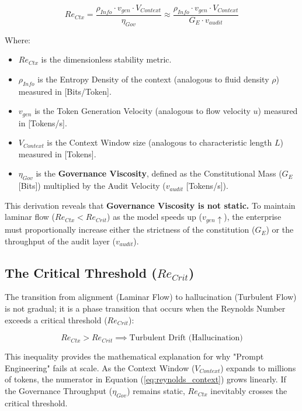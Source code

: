 \documentclass[11pt, a4paper]{article}
\newcommand{\Ge}{G_E}
\newcommand{\Vctx}{V_{Context}}
\newcommand{\ReCtx}{Re_{Ctx}}
\begin{document}
\begin{equation}
    \label{eq:reynolds_context}
    \ReCtx = \frac{\rho_{Info} \cdot v_{gen} \cdot \Vctx}{\eta_{Gov}} \approx \frac{\rho_{Info} \cdot v_{gen} \cdot \Vctx}{\Ge \cdot v_{audit}}
\end{equation}

\noindent
Where:
\begin{itemize}
    \item \textbf{$\ReCtx$} is the dimensionless stability metric.
    \item \textbf{$\rho_{Info}$} is the Entropy Density of the context (analogous to fluid density $\rho$) measured in [Bits/Token].
    \item \textbf{$v_{gen}$} is the Token Generation Velocity (analogous to flow velocity $u$) measured in [Tokens/s].
    \item \textbf{$\Vctx$} is the Context Window size (analogous to characteristic length $L$) measured in [Tokens].
    \item \textbf{$\eta_{Gov}$} is the \textbf{Governance Viscosity}, defined as the Constitutional Mass ($\Ge$ [Bits]) multiplied by the Audit Velocity ($v_{audit}$ [Tokens/s]).
\end{itemize}

This derivation reveals that \textbf{Governance Viscosity is not static.} To maintain laminar flow ($\ReCtx < Re_{Crit}$) as the model speeds up ($v_{gen} \uparrow$), the enterprise must proportionally increase either the strictness of the constitution ($\Ge$) or the throughput of the audit layer ($v_{audit}$).

\subsection{The Critical Threshold ($Re_{Crit}$)}

The transition from alignment (Laminar Flow) to hallucination (Turbulent Flow) is not gradual; it is a phase transition that occurs when the Reynolds Number exceeds a critical threshold ($Re_{Crit}$):

\begin{equation}
    \label{eq:turbulence_condition}
    \ReCtx > Re_{Crit} \implies \text{Turbulent Drift (Hallucination)}
\end{equation}

This inequality provides the mathematical explanation for why "Prompt Engineering" fails at scale. As the Context Window ($\Vctx$) expands to millions of tokens, the numerator in Equation (\ref{eq:reynolds_context}) grows linearly. If the Governance Throughput ($\eta_{Gov}$) remains static, $\ReCtx$ inevitably crosses the critical threshold.
\end{document}
